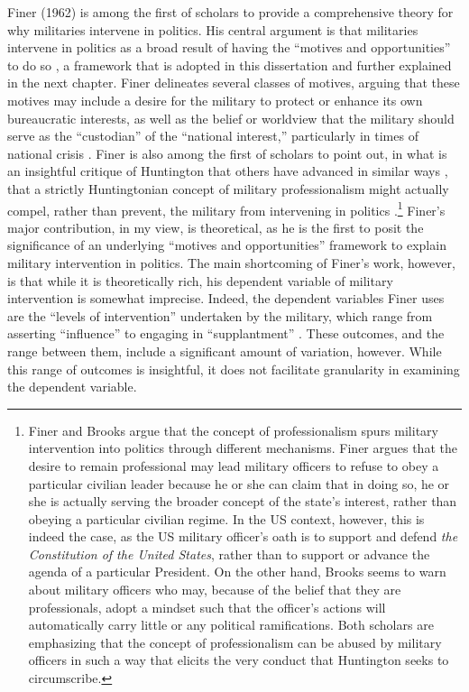 \documentclass[
  12pt,
  oneside]{memoir}
\begin{document}
Finer (1962) is among the first of scholars to provide a comprehensive theory for why militaries intervene in politics. His central argument is that militaries intervene in politics as a broad result of having the ``motives and opportunities'' to do so \autocite[20-76]{finer_man_1962}, a framework that is adopted in this dissertation and further explained in the next chapter. Finer delineates several classes of motives, arguing that these motives may include a desire for the military to protect or enhance its own bureaucratic interests, as well as the belief or worldview that the military should serve as the ``custodian'' of the ``national interest,'' particularly in times of national crisis \autocite[30-31]{finer_man_1962}. Finer is also among the first of scholars to point out, in what is an insightful critique of Huntington that others have advanced in similar ways \autocite[for instance, see][]{brooks_paradoxes_2020}, that a strictly Huntingtonian concept of military professionalism might actually compel, rather than prevent, the military from intervening in politics \autocite[22-23]{finer_man_1962}.\footnote{Finer and Brooks argue that the concept of professionalism spurs military intervention into politics through different mechanisms. Finer argues that the desire to remain professional may lead military officers to refuse to obey a particular civilian leader because he or she can claim that in doing so, he or she is actually serving the broader concept of the state's interest, rather than obeying a particular civilian regime. In the US context, however, this is indeed the case, as the US military officer's oath is to support and defend \emph{the Constitution of the United States}, rather than to support or advance the agenda of a particular President. On the other hand, Brooks seems to warn about military officers who may, because of the belief that they are professionals, adopt a mindset such that the officer's actions will automatically carry little or any political ramifications. Both scholars are emphasizing that the concept of professionalism can be abused by military officers in such a way that elicits the very conduct that Huntington seeks to circumscribe.} Finer's major contribution, in my view, is theoretical, as he is the first to posit the significance of an underlying ``motives and opportunities'' framework to explain military intervention in politics. The main shortcoming of Finer's work, however, is that while it is theoretically rich, his dependent variable of military intervention is somewhat imprecise. Indeed, the dependent variables Finer uses are the ``levels of intervention'' undertaken by the military, which range from asserting ``influence'' to engaging in ``supplantment'' \autocite[77-116]{finer_man_1962}. These outcomes, and the range between them, include a significant amount of variation, however. While this range of outcomes is insightful, it does not facilitate granularity in examining the dependent variable.
\end{document}
